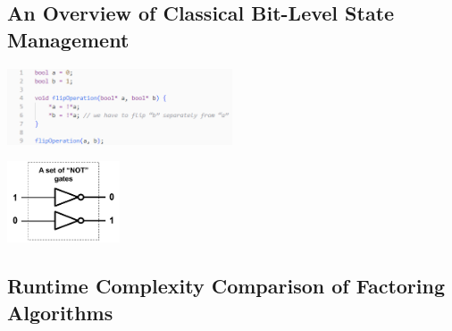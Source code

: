 \documentclass[conference]{IEEEtran}
\begin{document}
\begin{appendices}
\appendix

\subsection{An Overview of Classical Bit-Level State Management}
\label{appendix:OverviewClassicalStateMgmnt}

\centerline{
    \includegraphics[width=0.5\textwidth]{img/bit_flip_code_block.png}
}
\label{fig:bitflipcodeblock}

\centerline{
    \includegraphics[width=0.25\textwidth]{img/set_of_not_gates.png}
}
\label{fig:setofnotgates}






\subsection{Runtime Complexity Comparison of Factoring Algorithms}
\label{appendix:RuntimeComplexityComparison}


\end{appendices}
\end{document}

